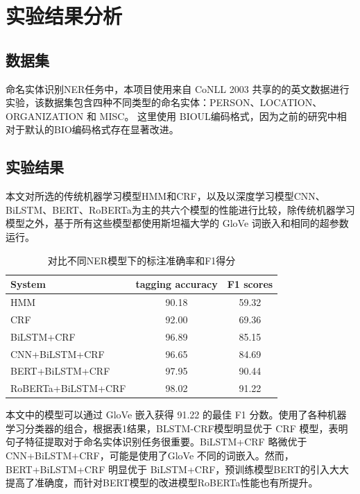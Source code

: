 \documentclass[a4paper, 12pt]{article}
\begin{document}
\section{实验结果分析} %
\label{sec:analysis}

\subsection{数据集} %
\label{sub:dataset}
命名实体识别NER任务中，本项目使用来自 CoNLL 2003 共享的的英文数据进行实验，该数据集包含四种不同类型的命名实体：PERSON、LOCATION、ORGANIZATION 和 MISC。 这里使用 BIOUL编码格式，因为之前的研究中相对于默认的BIO编码格式存在显著改进。

\subsection{实验结果} %
\label{sub:res}

本文对所选的传统机器学习模型HMM和CRF，以及以深度学习模型CNN、BiLSTM、BERT、RoBERTa为主的共六个模型的性能进行比较，除传统机器学习模型之外，基于所有这些模型都使用斯坦福大学的 GloVe 词嵌入和相同的超参数运行。



\begin{table}[htbp]
    \begin{center}
    \large 
    \begin{tabular}{lcc}
        \hline
         System & tagging accuracy & F1 scores \\   
        \hline
        
         HMM                &       90.18 & 59.32          \\
         CRF                &       92.00 & 69.36          \\
         BiLSTM+CRF         &       96.89 & 85.15        \\
         CNN+BiLSTM+CRF     &       96.65 & 84.69          \\
         BERT+BiLSTM+CRF    &       97.95 & 90.44         \\
         RoBERTa+BiLSTM+CRF &       98.02 & 91.22      \\
        \hline
    \end{tabular}
    \end{center}
    \caption {对比不同NER模型下的标注准确率和F1得分} 
\end{table}

本文中的模型可以通过 GloVe 嵌入获得 91.22 的最佳 F1 分数。使用了各种机器学习分类器的组合，根据表1结果，BLSTM-CRF模型明显优于 CRF 模型，表明句子特征提取对于命名实体识别任务很重要。BiLSTM+CRF 略微优于 CNN+BiLSTM+CRF，可能是使用了GloVe 不同的词嵌入。然而，BERT+BiLSTM+CRF 明显优于 BiLSTM+CRF，预训练模型BERT的引入大大提高了准确度，而针对BERT模型的改进模型RoBERTa性能也有所提升。
\end{document}
